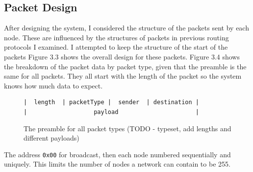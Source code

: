 \documentclass[12pt,a4paper]{report}
\begin{document}
\subsection{Packet Design}
After designing the system, I considered the structure of the packets sent by each node. These are  influenced by the structures of packets in previous routing protocols I examined. I attempted to keep the structure of the start of the packets  Figure 3.3 shows the overall design for these packets. Figure 3.4 shows the breakdown of the packet data by packet type, given that the preamble is the same for all packets. They all start with the length of the packet so the system knows how much data to expect. \\
\begin{figure}
\begin{center}
\begin{verbatim}
|  length  | packetType |  sender  | destination | 
|                   payload                      | 
\end{verbatim}
\end{center}
\caption{The preamble for all packet types (TODO - typeset, add lengths and different payloads)}
\end{figure}
The address \verb'0x00' for broadcast, then each node numbered sequentially and uniquely. This limits the number of nodes a network can contain to be 255.
\end{document}
